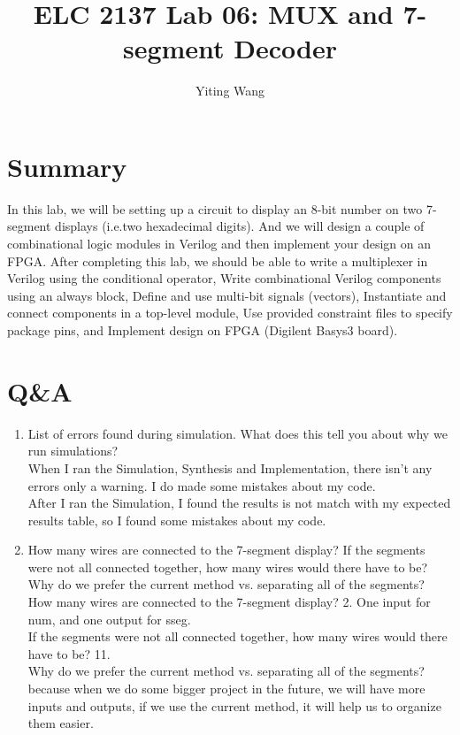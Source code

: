 \documentclass[11pt]{article}
\begin{document}
\title{ELC 2137 Lab 06: MUX and 7-segment Decoder}
\author{Yiting Wang}

\maketitle


\section*{Summary}

In this lab, we will be setting up a circuit to display an 8-bit number on two 7-segment displays (i.e.two  hexadecimal  digits). And we will design a couple of combinational logic modules in Verilog and then implement your design on an FPGA. After completing this lab, we should be able to write a multiplexer in Verilog using the conditional operator, Write combinational Verilog components using an always block, Define and use multi-bit signals (vectors), Instantiate and connect components in a top-level module, Use provided constraint files to specify package pins, and Implement design on FPGA (Digilent Basys3 board).\\



\section*{Q\&A}

\begin{enumerate}
	\item List of errors found during simulation. What does this tell you about why we run simulations?\\
	
	When I ran the Simulation, Synthesis and Implementation, there isn't any errors only a warning. I do made some mistakes about my code. \\
	After I ran the Simulation, I found the results is not match with my  expected results table, so I found some mistakes about my code.\\
	\item How many wires are connected to the 7-segment display? If the segments were not all connected together, how many wires would there have to be? Why do we prefer the current method  vs. separating all of the segments?\\
	
	How many wires are connected to the 7-segment display? 2. One input for num, and one output for sseg.\\ 
	If the segments were not all connected together, how many wires would there have to be? 11. \\
	Why do we prefer the current method  vs. separating all of the segments? because when we do some bigger project in the future, we will have more inputs and outputs, if we use the current method, it will help us to organize them easier.\\
\end{enumerate}
\end{document}
